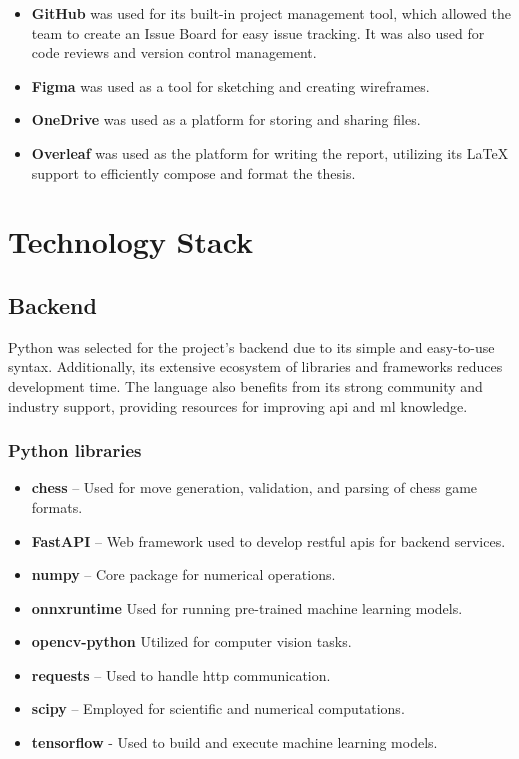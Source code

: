 \begin{itemize}
    \item \textbf{GitHub} was used for its built-in project management tool, which allowed the team to create an Issue Board for easy issue tracking. It was also used for code reviews and version control management.
    
    \item \textbf{Figma} was used as a tool for sketching and creating wireframes.
    
    \item \textbf{OneDrive} was used as a platform for storing and sharing files.
    
    \item \textbf{Overleaf} was used as the platform for writing the report, utilizing its LaTeX support to efficiently compose and format the thesis.
\end{itemize}


\section{Technology Stack}
\label{sec:technology-stack}

\subsection*{Backend}

Python was selected for the project's backend due to its simple and easy-to-use syntax. Additionally, its extensive ecosystem of libraries and frameworks reduces development time. The language also benefits from its strong community and industry support, providing resources for improving \gls{api} and \gls{ml} knowledge.

\subsubsection*{Python libraries}

\begin{itemize}
    \item \textbf{chess} – Used for move generation, validation, and parsing of chess game formats. \cite{python:chess}
    \item \textbf{FastAPI} – Web framework used to develop \acrshort{rest}ful \glspl{api} for backend services. \cite{python:fastapi}
    \item \textbf{numpy} – Core package for numerical operations. \cite{python:numpy}
    \item \textbf{onnxruntime} Used for running pre-trained machine learning models. \cite{python:onnx}
    \item \textbf{opencv-python} Utilized for computer vision tasks. \cite{python:opencv}
    \item \textbf{requests} – Used to handle \gls{http} communication. \cite{python:requests}
    \item \textbf{scipy} – Employed for scientific and numerical computations. \cite{python:scipy}
    \item \textbf{tensorflow} - Used to build and execute machine learning models. \cite{python:tensorflow}
\end{itemize}


